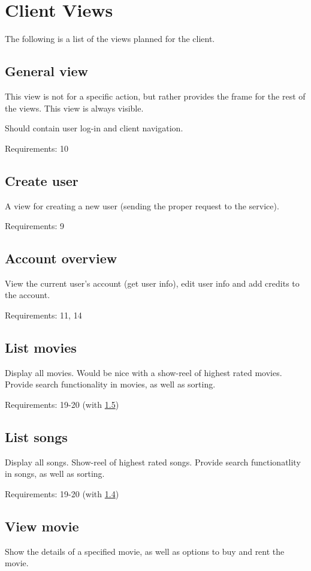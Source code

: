 \section{Client Views}
\label{app:client-views}

The following is a list of the views planned for the client.

\subsection{General view}
This view is not for a specific action, but rather provides the frame for the rest
of the views. This view is always visible.

Should contain user log-in and client navigation.

Requirements: 10

\subsection{Create user}
A view for creating a new user (sending the proper request to the service).

Requirements: 9

\subsection{Account overview}
View the current user's account (get user info), edit user info and add credits to
the account.

Requirements: 11, 14

\subsection{List movies}
\label{app:client-views-list-movies}
Display all movies. Would be nice with a show-reel of highest rated movies. Provide search
functionality in movies, as well as sorting.

Requirements: 19-20 (with \ref{app:client-views-list-songs})

\subsection{List songs}
\label{app:client-views-list-songs}
Display all songs. Show-reel of highest rated songs. Provide search functionatlity in songs,
as well as sorting.

Requirements: 19-20 (with \ref{app:client-views-list-movies})

\subsection{View movie}
\label{app:client-views-view-movie}
Show the details of a specified movie, as well as options to buy and rent the movie.

